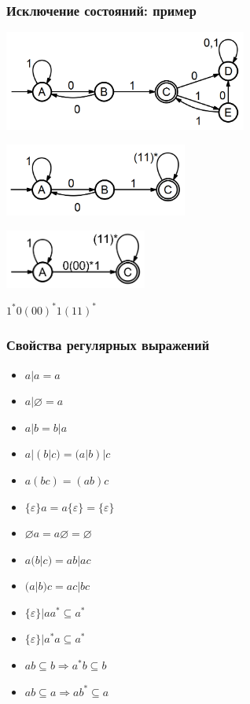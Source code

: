 \documentclass{beamer}
\begin{document}
\begin{frame}
  \transwipe[direction=90]
  \frametitle{Исключение состояний: пример}
    \begin{center}
      \includegraphics[width=0.60\textwidth]{pics/elim_ex.png}  
      
      \includegraphics[width=0.45\textwidth]{pics/elim_ex2.png}  
            
      \includegraphics[width=0.35\textwidth]{pics/elim_ex3.png}  
    \end{center}
    
    $1^* 0 (00)^* 1 (11)^*$
\end{frame}

\begin{frame}
  \transwipe[direction=90]
  \frametitle{Свойства регулярных выражений}
  \begin{itemize}
    \item $a | a = a$
    \item $a | \varnothing = a$
    \item $a | b = b | a$
    \item $a | (b | c) = (a | b) | c$
    \item $a(bc) = (ab)c$
    \item $\{\varepsilon \} a = a \{ \varepsilon \} = \{ \varepsilon \} $
    \item $\varnothing a = a \varnothing = \varnothing$
    \item $a (b| c) = ab | ac$
    \item $(a | b) c = ac | bc $
    \item $\{\varepsilon \} | aa^* \subseteq a^*$
    \item $\{\varepsilon \} | a^*a \subseteq a^*$
    \item $ab \subseteq b \Rightarrow a^* b \subseteq b$
    \item $ab \subseteq a \Rightarrow a b^* \subseteq a$
        
  \end{itemize}
\end{frame}
\end{document}

